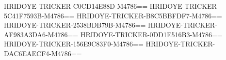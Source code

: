 HRIDOYE-TRICKER-C0CD14E88D-M4786==
HRIDOYE-TRICKER-5C41F7593B-M4786==
HRIDOYE-TRICKER-B8C5BBFDF7-M4786==
HRIDOYE-TRICKER-2538BDB79B-M4786==
HRIDOYE-TRICKER-AF983A3DA6-M4786==
HRIDOYE-TRICKER-0DD1E516B3-M4786==
HRIDOYE-TRICKER-156E9C83F0-M4786==
HRIDOYE-TRICKER-DAC6EAECF4-M4786==
